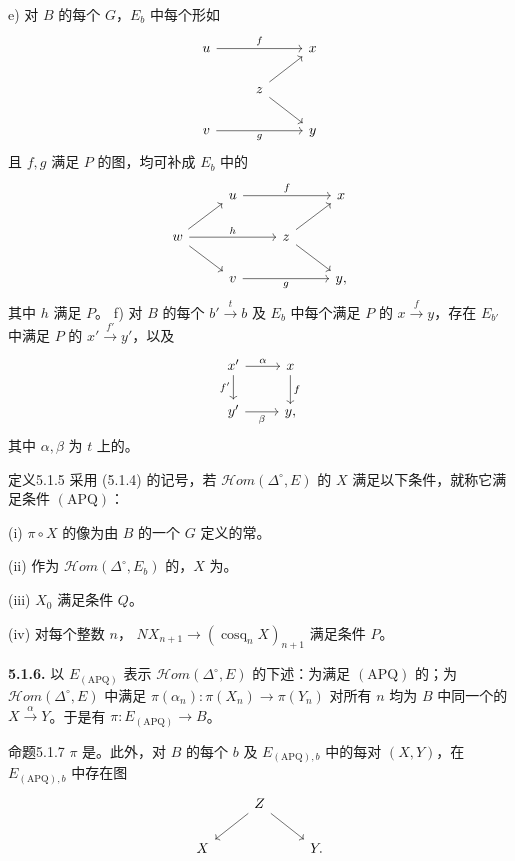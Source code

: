  e) 对 $B$ 的每个 $G$，$E_b$ 中每个形如
\[
\begin{tikzcd}
u\arrow[rr,"f"]&&x\\
&z\arrow[ur]\arrow[dr]&\\
v\arrow[rr,"g"']&&y
\end{tikzcd}
\]
且 $f,g$ 满足 $P$ 的图，均可补成 $E_b$ 中的
\[
\begin{tikzcd}
&u\arrow[rr,"f"]&&x\\
w\arrow[ur]\arrow[rr,"h"]\arrow[dr]&&z\arrow[ur]\arrow[dr]&\\
&v\arrow[rr,"g"']&&y,
\end{tikzcd}
\]
其中 $h$ 满足 $P$。
 f) 对 $B$ 的每个 $b'\xrightarrow{t}b$ 及 $E_b$ 中每个满足 $P$ 的 $x\xrightarrow{f}y$，存在 $E_{b'}$ 中满足 $P$ 的 $x'\xrightarrow{f'}y'$，以及
\[
\begin{tikzcd}
x'\arrow[r,"\alpha"]\arrow[d,"f'"']&x\arrow[d,"f"]\\
y'\arrow[r,"\beta"']&y,
\end{tikzcd}
\]
其中 $\alpha,\beta$ 为 $t$ 上的。
\begin{SGAresult}{定义}{5.1.5}
采用 (5.1.4) 的记号，若 $\mathcal{H}om(\Delta^\circ,E)$ 的 $X$ 满足以下条件，就称它满足条件 $(\mathrm{APQ})$：

(i) $\pi\circ X$ 的像为由 $B$ 的一个 $G$ 定义的常。

(ii) 作为 $\mathcal{H}om(\Delta^\circ,E_b)$ 的，$X$ 为。

(iii) $X_0$ 满足条件 $Q$。

(iv) 对每个整数 $n$， $NX_{n+1}\to(\operatorname{cosq}_nX)_{n+1}$ 满足条件 $P$。
\end{SGAresult}
\textbf{5.1.6.} 以 $E_{(\mathrm{APQ})}$ 表示 $\mathcal{H}om(\Delta^\circ,E)$ 的下述：为满足 $(\mathrm{APQ})$ 的；为 $\mathcal{H}om(\Delta^\circ,E)$ 中满足 $\pi(\alpha_n):\pi(X_n)\to\pi(Y_n)$ 对所有 $n$ 均为 $B$ 中同一个的 $X\xrightarrow{\alpha}Y$。于是有 $\pi:E_{(\mathrm{APQ})}\to B$。
\begin{SGAresult}{命题}{5.1.7}
 $\pi$ 是。此外，对 $B$ 的每个 $b$ 及 $E_{(\mathrm{APQ}),b}$ 中的每对 $(X,Y)$，在 $E_{(\mathrm{APQ}),b}$ 中存在图
\[
\begin{tikzcd}
&Z\arrow[dl]\arrow[dr]&\\
X&&Y.
\end{tikzcd}
\]
\end{SGAresult}
